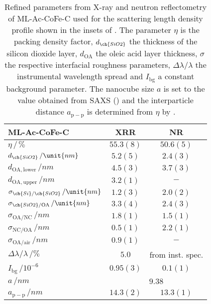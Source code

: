 \documentclass[\main/dresen_thesis.tex]{subfiles}
\begin{document}
  \begin{table}[!htbp]
    \centering
    \caption{\label{tab:monolayers:structure:ML-Ac-CoFe-C-WithSpacer}Refined parameters from X-ray and neutron reflectometry of ML-Ac-CoFe-C used for the scattering length density profile shown in the insets of . The parameter $\eta$ is the packing density factor, $d_{\ch{SiO2}}$ the thickness of the silicon dioxide layer, $d_{\mathrm{OA}}$ the oleic acid layer thickness, $\sigma$ the respective interfacial roughness parameters, $\Delta \lambda / \lambda$ the instrumental wavelength spread and $I_\mathrm{bg}$ a constant background parameter. The nanocube size $a$ is set to the value obtained from SAXS () and the interparticle distance $a_\mathrm{p-p}$ is determined from $\eta$ by .}
    \begin{tabular}{l | c | c}
      \hline
      ML-Ac-CoFe-C & \textbf{XRR} & \textbf{NR}\\
      \hline
      $\eta \, /\, \%$                               & $55.3(8)$  & $50.6(5)$  \\
      $d_{\ch{SiO2}} \, / \unit{nm}$                 & $5.2(5)$   & $2.4(3)$  \\
      $d_{\mathrm{OA, lower}} \, / \unit{nm}$        & $4.5(3)$   & $3.7(3)$  \\
      $d_{\mathrm{OA, upper}} \, / \unit{nm}$        & $3.2(1)$   & $-$  \\
      $\sigma_{\ch{Si}/\ch{SiO2}} \, / \unit{nm}$    & $1.2(3)$   & $2.0(2)$  \\
      $\sigma_{\ch{SiO2}/\mathrm{OA}}\, / \unit{nm}$ & $3.3(4)$   & $2.4(3)$  \\
      $\sigma_\mathrm{OA/NC} \, / \unit{nm}$         & $1.8(1)$   & $1.5(1)$  \\
      $\sigma_\mathrm{NC/OA} \, / \unit{nm}$         & $0.5(1)$   & $2.2(1)$  \\
      $\sigma_\mathrm{OA/air} \, / \unit{nm}$        & $0.9(1)$   & $-$  \\
      $\Delta \lambda / \lambda \, / \unit{\%}$      & $5.0 $     & from inst. spec.\\
      $I_\mathrm{bg}\,/\unit{10^{-6}}$               & $0.95(3)$  & $0.1(1)$\\
      \hline
      $a \, / \unit{nm}$                             & \multicolumn{2}{c}{$9.38$} \\
      \hline
      $a_\mathrm{p-p} \, / \unit{nm}$                & $14.3(2)$     & $13.3(1)$ \\
      \hline
    \end{tabular}
  \end{table}
\end{document}
